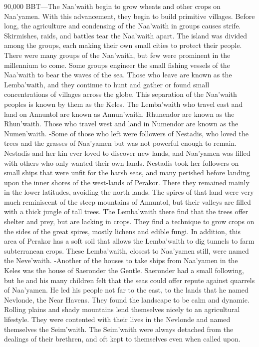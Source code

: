 \documentclass[smalldemyvopaper,11pt,twoside,onecolumn,openright,extrafontsizes]{memoir}
\begin{document}
{{90,000 BBT—The Naa’waith begin to grow wheats and other crops on Naa’yamen. With this advancement, they begin to build primitive villages. Before long, the agriculture and condensing of the Naa’waith in groups causes strife. Skirmishes, raids, and battles tear the Naa’waith apart. The island was divided among the groups, each making their own small cities to protect their people. There were many groups of the Naa’waith, but few were prominent in the millennium to come.
Some groups engineer the small fishing vessels of the Naa’waith to bear the waves of the sea. Those who leave are known as the Lemba'waith, and they continue to hunt and gather or found small concentrations of villages across the globe. This separation of the Naa’waith peoples is known by them as the Keles. The Lemba’waith who travel east and land on Annuntol are known as Annun’waith. Rhunendor are known as the Rhun’waith. Those who travel west and land in Numendor are known as the Numen’waith.
-Some of those who left were followers of Nestadis, who loved the trees and the grasses of Naa’yamen but was not powerful enough to remain. Nestadis and her kin ever loved to discover new lands, and Naa’yamen was filled with others who only wanted their own lands. Nestadis took her followers on small ships that were unfit for the harsh seas, and many perished before landing upon the inner shores of the west-lands of Perakor. There they remained mainly in the lower latitudes, avoiding the north lands. The spires of that land were very much reminiscent of the steep mountains of Annuntol, but their valleys are filled with a thick jungle of tall trees. The Lemba’waith there find that the trees offer shelter and prey, but are lacking in crops. They find a technique to grow crops on the sides of the great spires, mostly lichens and edible fungi. In addition, this area of Perakor has a soft soil that allows the Lemba’waith to dig tunnels to farm subterranean crops. These Lemba’waith, closest to Naa’yamen still, were named the Neve’waith.
-Another of the houses to take ships from Naa’yamen in the Keles was the house of Saeronder the Gentle. Saeronder had a small following, but he and his many children felt that the seas could offer repute against quarrels of Naa’yamen. He led his people not far to the east, to the lands that he named Nevlonde, the Near Havens. They found the landscape to be calm and dynamic. Rolling plains and shady mountains lend themselves nicely to an agricultural lifestyle. They were contented with their lives in the Nevlonde and named themselves the Seim’waith. The Seim’waith were always detached from the dealings of their brethren, and oft kept to themselves even when called upon.
}}
\end{document}
